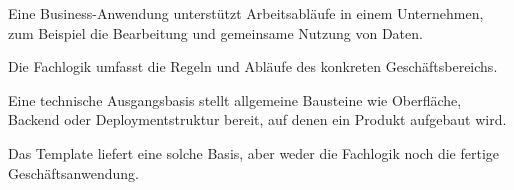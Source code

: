 \begin{beginnerstatement}

Eine Business-Anwendung unterstützt Arbeitsabläufe in einem Unternehmen, zum
Beispiel die Bearbeitung und gemeinsame Nutzung von Daten.

Die Fachlogik umfasst die Regeln und Abläufe des konkreten Geschäftsbereichs.

Eine technische Ausgangsbasis stellt allgemeine Bausteine wie Oberfläche,
Backend oder Deploymentstruktur bereit, auf denen ein Produkt aufgebaut wird.

Das Template liefert eine solche Basis, aber weder die Fachlogik noch die
fertige Geschäftsanwendung.

\end{beginnerstatement}
